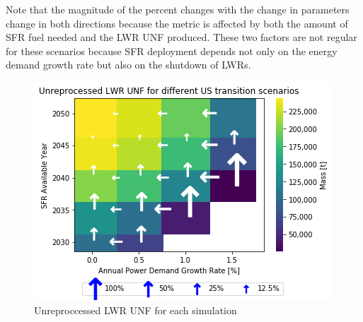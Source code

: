 Note that the magnitude of the percent changes with the change
in parameters change in both directions because the metric is
affected by both the amount of \gls{SFR} fuel needed and the 
\gls{LWR} \gls{UNF} produced. These two factors are not regular
for these scenarios because \gls{SFR} deployment depends not only
on the energy demand growth rate but also on the shutdown of
\glspl{LWR}.

\begin{figure}[htbp!]
    \begin{center}
        \includegraphics[scale=0.7]{./images/us/scat_both_Unreprocessed_LWR_UNF.png}
    \end{center}
        \caption{Unreproccessed \gls{LWR} \gls{UNF} for each simulation}
    \label{fig:us_lwr_unf_rep}
\end{figure}

